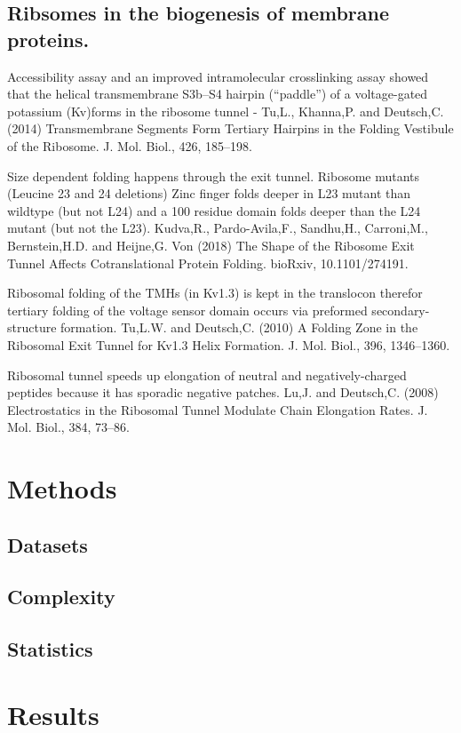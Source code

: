 \subsection{Ribsomes in the biogenesis of membrane proteins.}
Accessibility assay and an improved intramolecular crosslinking assay showed that the helical transmembrane S3b–S4 hairpin (“paddle”) of a voltage-gated potassium (Kv)forms in the ribosome tunnel - Tu,L., Khanna,P. and Deutsch,C. (2014) Transmembrane Segments Form Tertiary Hairpins in the Folding Vestibule of the Ribosome. J. Mol. Biol., 426, 185–198.

 Size dependent folding happens through the exit tunnel. Ribosome mutants (Leucine 23 and 24 deletions) Zinc finger folds deeper in L23 mutant than wildtype (but not L24) and a 100 residue domain folds deeper than the L24 mutant (but not the L23). Kudva,R., Pardo-Avila,F., Sandhu,H., Carroni,M., Bernstein,H.D. and Heijne,G. Von (2018) The Shape of the Ribosome Exit Tunnel Affects Cotranslational Protein Folding. bioRxiv, 10.1101/274191.

Ribosomal folding of the TMHs (in Kv1.3) is kept in the translocon therefor tertiary folding of the voltage sensor domain occurs via preformed secondary-structure formation. Tu,L.W. and Deutsch,C. (2010) A Folding Zone in the Ribosomal Exit Tunnel for Kv1.3 Helix Formation. J. Mol. Biol., 396, 1346–1360.

Ribosomal tunnel speeds up elongation of neutral and negatively-charged peptides because it has sporadic negative patches. Lu,J. and Deutsch,C. (2008) Electrostatics in the Ribosomal Tunnel Modulate Chain Elongation Rates. J. Mol. Biol., 384, 73–86.

\section{Methods}
\subsection{Datasets}
\subsection{Complexity}
\subsection{Statistics}

\section{Results}
